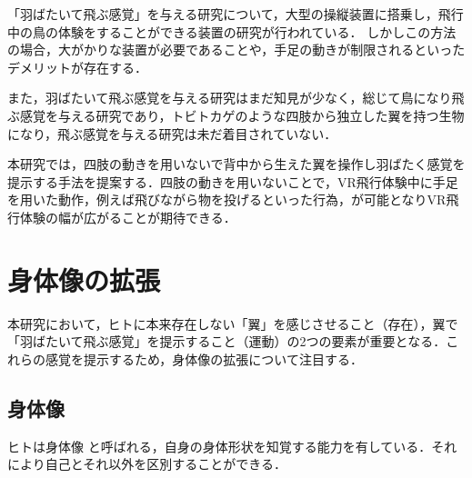 \begin{small}
    「羽ばたいて飛ぶ感覚」を与える研究について，大型の操縦装置に搭乗し，飛行中の鳥の体験をすることができる装置の研究が行われている\cite{rheiner2014birdly}．
    しかしこの方法の場合，大がかりな装置が必要であることや，手足の動きが制限されるといったデメリットが存在する．
    
    また，羽ばたいて飛ぶ感覚を与える研究はまだ知見が少なく，総じて鳥になり飛ぶ感覚を与える研究であり，トビトカゲのような四肢から独立した翼を持つ生物になり，飛ぶ感覚を与える研究は未だ着目されていない．

    本研究では，四肢の動きを用いないで背中から生えた翼を操作し羽ばたく感覚を提示する手法を提案する．四肢の動きを用いないことで，VR飛行体験中に手足を用いた動作，例えば飛びながら物を投げるといった行為，が可能となりVR飛行体験の幅が広がることが期待できる．

\section{身体像の拡張}
  本研究において，ヒトに本来存在しない「翼」を感じさせること（存在），翼で「羽ばたいて飛ぶ感覚」を提示すること（運動）の2つの要素が重要となる．これらの感覚を提示するため，身体像の拡張について注目する．

  \subsection{身体像}
    ヒトは身体像
    \cite{head1911sensory}と呼ばれる，自身の身体形状を知覚する能力を有している．それにより自己とそれ以外を区別することができる．





\end{small}
